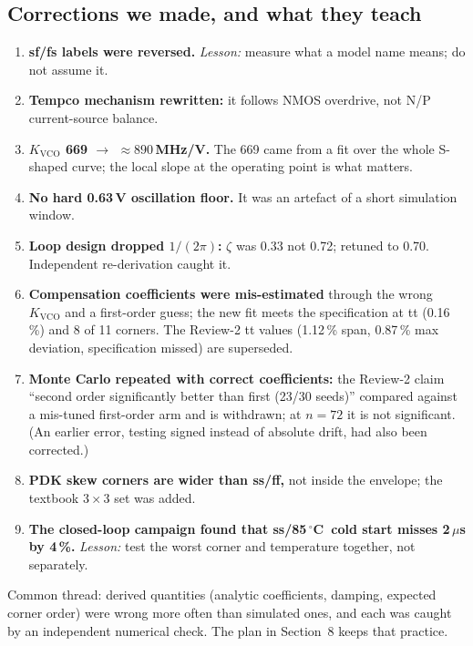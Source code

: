 \documentclass[11pt,a4paper]{article}
\newcommand{\kvco}{K_{\mathrm{VCO}}}
\newcommand{\degC}{\,$^\circ$C}
\begin{document}
\subsection{Corrections we made, and what they teach}
\begin{enumerate}[nosep]
\item \textbf{sf/fs labels were reversed.} \emph{Lesson:} measure what a model name means; do not assume it.
\item \textbf{Tempco mechanism rewritten:} it follows NMOS overdrive, not N/P current-source balance.
\item \textbf{$\kvco$ 669 $\to$ $\approx890$\,MHz/V.} The 669 came from a fit over the whole S-shaped curve; the local slope at the operating point is what matters.
\item \textbf{No hard 0.63\,V oscillation floor.} It was an artefact of a short simulation window.
\item \textbf{Loop design dropped $1/(2\pi)$:} $\zeta$ was 0.33 not 0.72; retuned to 0.70. Independent re-derivation caught it.
\item \textbf{Compensation coefficients were mis-estimated} through the wrong $\kvco$ and a first-order guess; the new fit meets the specification at tt (0.16\,\%) and 8 of 11 corners. The Review-2 tt values (1.12\,\% span, 0.87\,\% max deviation, specification missed) are superseded.
\item \textbf{Monte Carlo repeated with correct coefficients:} the Review-2 claim ``second order significantly better than first (23/30 seeds)'' compared against a mis-tuned first-order arm and is withdrawn; at $n=72$ it is not significant. (An earlier error, testing signed instead of absolute drift, had also been corrected.)
\item \textbf{PDK skew corners are wider than ss/ff,} not inside the envelope; the textbook $3\times3$ set was added.
\item \textbf{The closed-loop campaign found that ss/85\degC\ cold start misses 2\,$\mu$s by 4\,\%.} \emph{Lesson:} test the worst corner and temperature together, not separately.
\end{enumerate}
Common thread: derived quantities (analytic coefficients, damping, expected corner order) were wrong more often than simulated ones, and each was caught by an independent numerical check. The plan in Section~8 keeps that practice.
\end{document}
